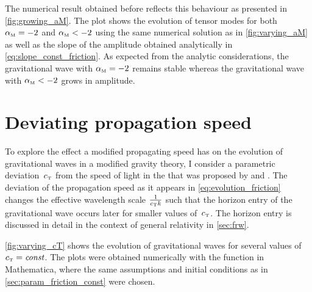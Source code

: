 The numerical result obtained before reflects this behaviour as presented in \autoref{fig:growing_aM}. The plot shows the evolution of tensor modes for both \({\alpha_{\textnormal{\tiny{M}}}} = -2\) and \({\alpha_{\textnormal{\tiny{M}}}} < -2\) using the same numerical solution as in \autoref{fig:varying_aM} as well as the slope of the amplitude obtained analytically in \eqref{eq:slope_const_friction}. As expected from the analytic considerations, the gravitational wave with \({\alpha_{\textnormal{\tiny{M}}}} = -2\) remains stable whereas the gravitational wave with \({\alpha_{\textnormal{\tiny{M}}}} < -2\) grows in amplitude.



\section{Deviating propagation speed}\label{sec:param_dev_prop_speed}

To explore the effect a modified propagating speed has on the evolution of gravitational waves in a modified gravity theory, I consider a parametric deviation~\({c_{\textnormal{\tiny{T}}}}\) from the speed of light in the  that was proposed by \textcite{Amendola2014} and \textcite{Raveri2014}. The deviation of the propagation speed as it appears in \eqref{eq:evolution_friction} changes the effective wavelength scale \(\frac{1}{{c_{\textnormal{\tiny{T}}}} k}\) such that the horizon entry of the gravitational wave occurs later for smaller values of~\({c_{\textnormal{\tiny{T}}}}\). The horizon entry is discussed in detail in the context of general relativity in \autoref{sec:frw}.

\autoref{fig:varying_cT} shows the evolution of gravitational waves for several values of \({c_{\textnormal{\tiny{T}}}}=\textnormal{\textit{const}}\). The plots were obtained numerically with the  function in Mathematica, where the same assumptions and initial conditions as in \autoref{sec:param_friction_const} were chosen.


